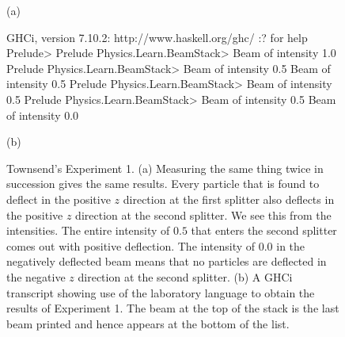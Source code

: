 \documentclass{eptcs}
\newcommand{\FunctionTok}[1]{\textcolor[rgb]{0.02,0.16,0.49}{{#1}}}
\newcommand{\darkgreen}[1]{\textcolor[rgb]{0.00,0.80,0.00}{#1}}
\begin{document}
\begin{figure}
  \begin{center}

(a)
  \end{center}
\begin{center}
\begin{Highlighting}[]
GHCi, version 7.10.2: http://www.haskell.org/ghc/  :? for help
Prelude> \color{blue}{:m Physics.Learn.BeamStack}
Prelude Physics.Learn.BeamStack> \color{blue}{randomBeam}
\darkgreen{Beam of intensity 1.0}
Prelude Physics.Learn.BeamStack> \color{blue}{splitZ it}
\darkgreen{Beam of intensity 0.5}
\darkgreen{Beam of intensity 0.5}
Prelude Physics.Learn.BeamStack> \color{blue}{dropBeam it}
\darkgreen{Beam of intensity 0.5}
Prelude Physics.Learn.BeamStack> \color{blue}{splitZ it}
\darkgreen{Beam of intensity 0.5}
\darkgreen{Beam of intensity 0.0}
\end{Highlighting}

(b)
\end{center}
\caption{Townsend's\cite{townsend} Experiment 1.  (a) Measuring the same thing twice
  in succession gives the same results.  Every particle that is found to deflect
  in the positive $z$ direction at the first splitter also deflects in the
  positive $z$ direction at the second splitter.  We see this from the intensities.
  The entire intensity of $0.5$ that enters the second splitter comes out with
  positive deflection.  The intensity of $0.0$ in the negatively deflected beam
  means that no particles are deflected in the negative $z$ direction at the
  second splitter.
  (b) A GHCi transcript showing use of the laboratory language to obtain the
  results of Experiment 1.  The beam at the top of the stack is the
  last beam printed and hence appears at the bottom of the list.}
\label{townsend1fig}
\end{figure}
\end{document}
